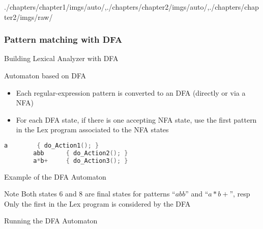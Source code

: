 \begin{graphicspathcontext}{{./chapters/chapter1/imgs/auto/},{./chapters/chapter2/imgs/auto/},{./chapters/chapter2/imgs/raw/}}
\begin{bibunit}[apalike]
\subsubsection{Pattern matching with DFA}
\subsubsectiontableofcontentslide

\begin{frame}[fragile]{{Building Lexical Analyzer} with DFA}
	\begin{block}{Automaton based on DFA}
		\begin{itemize}
		\item Each regular-expression pattern is converted to an DFA (directly or via a NFA)
		\item For each DFA state, if there is one accepting NFA state, use the first pattern in the Lex program associated to the NFA states
		\end{itemize}
	\end{block}
	\vspace{1cm}
	\begin{example}
		\begin{lstlisting}[language=C,basicstyle={\normalsize}]
		a        { do_Action1(); }
		abb      { do_Action2(); }
		a*b+     { do_Action3(); }
		\end{lstlisting}
	\end{example}
\end{frame}

\begin{frame}{Example of the DFA Automaton}
	\centering{} \\[.25cm]
	\begin{block}{\small Note}\small
	Both states $6$ and $8$ are final states for patterns ``$abb$'' and ``$a*b+$'', resp \\
	Only the first in the Lex program is considered by the DFA
	\end{block}
\end{frame}

\begin{frame}{Running the DFA Automaton}
	\begin{rightarrowsequence}
	\end{rightarrowsequence}
\end{frame}


\end{bibunit}
\end{graphicspathcontext}
